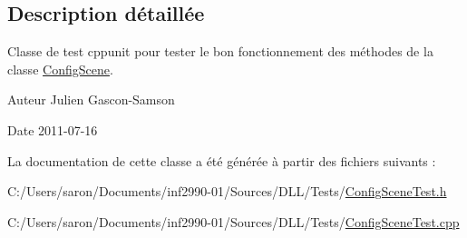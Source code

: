 \subsection{Description détaillée}
Classe de test cppunit pour tester le bon fonctionnement des méthodes de la classe \hyperlink{class_config_scene}{Config\-Scene}. 

\begin{DoxyAuthor}{Auteur}
Julien Gascon-\/\-Samson 
\end{DoxyAuthor}
\begin{DoxyDate}{Date}
2011-\/07-\/16 
\end{DoxyDate}


La documentation de cette classe a été générée à partir des fichiers suivants \-:\begin{DoxyCompactItemize}
\item 
C\-:/\-Users/saron/\-Documents/inf2990-\/01/\-Sources/\-D\-L\-L/\-Tests/\hyperlink{_config_scene_test_8h}{Config\-Scene\-Test.\-h}\item 
C\-:/\-Users/saron/\-Documents/inf2990-\/01/\-Sources/\-D\-L\-L/\-Tests/\hyperlink{_config_scene_test_8cpp}{Config\-Scene\-Test.\-cpp}\end{DoxyCompactItemize}
